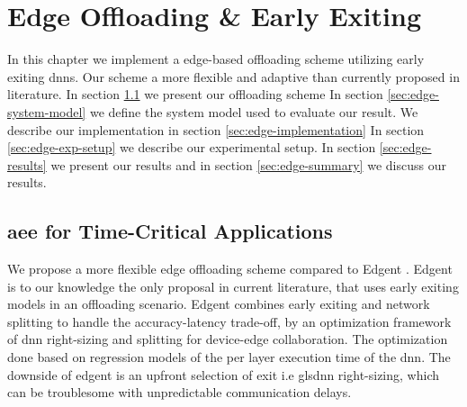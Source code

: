 \chapter{Edge Offloading \& Early Exiting}

In this chapter we implement a edge-based offloading scheme utilizing early exiting \gls{dnn}s. Our scheme a more flexible and adaptive than currently proposed in literature. In section \ref{sec:edge-aee} we present our offloading scheme In section \ref{sec:edge-system-model} we define the system model used to evaluate our result. We describe our implementation in section \ref{sec:edge-implementation} In section \ref{sec:edge-exp-setup} we describe our experimental setup. In section \ref{sec:edge-results} we present our results and in section \ref{sec:edge-summary} we discuss our results.

\section{\acrfull{aee} for Time-Critical Applications} \label{sec:edge-aee}

We propose a more flexible edge offloading scheme compared to Edgent \cite{li_edge_2018}. Edgent is to our knowledge the only proposal in current literature, that uses early exiting models in an offloading scenario. Edgent combines early exiting and network splitting to handle the accuracy-latency trade-off, by an optimization framework of \gls{dnn} right-sizing and splitting for device-edge collaboration. The optimization done based on regression models of the per layer execution time of the \gls{dnn}. The downside of edgent is an upfront selection of exit i.e gls{dnn} right-sizing, which can be troublesome with unpredictable communication delays. 

